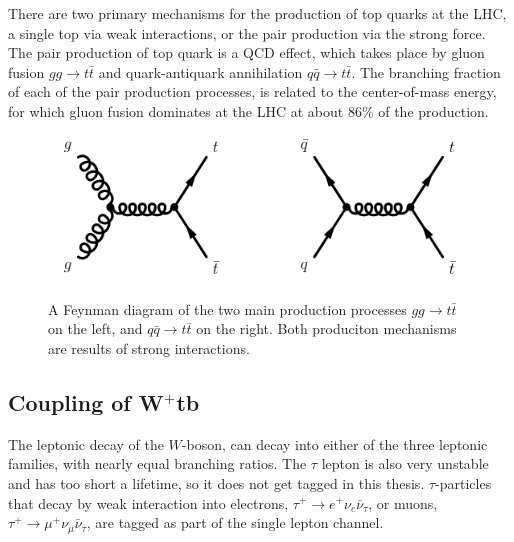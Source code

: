 \documentclass[12pt,a4paper]{article}
\numberwithin{equation}{section}
\begin{document}
There are two primary mechanisms for the production of top quarks at the LHC, a
single top via weak interactions, or the pair production via the strong force.
The pair production of top quark is a QCD effect, which takes place by gluon
fusion $gg \rightarrow t\bar t$ and quark-antiquark annihilation $q\bar q \rightarrow t\bar t$. The
branching fraction of each of the pair production processes, is related to the
center-of-mass energy, for which gluon fusion dominates at the LHC at about 86\%
of the production\cite{dasilva2016quark}.
\begin{figure}[H]
  \centering
	\includegraphics[width=\linewidth]{figures/placeholder_feynman_ttproduction.png}\\
	\caption{A Feynman diagram of the two main production processes $gg \rightarrow t\bar t$
    on the left, and $q\bar q \rightarrow t\bar t$ on the right. Both produciton
    mechanisms are results of strong interactions.}\label{fig:ttproduction}
\end{figure}

\subsection{Coupling of W$^+$tb}\label{sec:coupling}
The leptonic decay of the $W$-boson, can decay into either of the three leptonic
families, with nearly equal branching ratios. The $\tau$ lepton is also very
unstable and has too short a lifetime, so it does not get tagged in this thesis.
$\tau$-particles that decay by weak interaction into electrons,
$\tau^+ \rightarrow e^+ \nu_e \bar \nu_{\tau}$, or muons, $\tau^+ \rightarrow \mu^+ \nu_\mu \bar \nu_{\tau}$, are tagged as part of
the single lepton channel.\\
\end{document}
